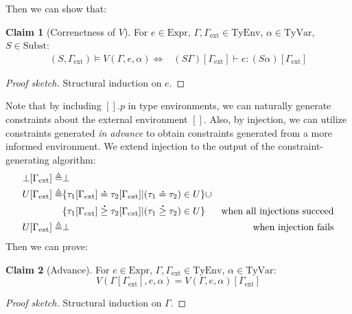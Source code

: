 \documentclass{article}
\theoremstyle{definition}
\newtheorem{clm}{Claim}[section]
\newcommand*{\A}[1]{\overset{\,_{\mbox{\Large .}}}{#1}}
\newcommand*{\Expr}{\text{Expr}}
\newcommand*{\TyEnv}{\text{TyEnv}}
\newcommand*{\TyVar}{\text{TyVar}}
\newcommand*{\Subst}{\text{Subst}}
\newcommand*{\external}{\Gamma_{\text{ext}}}
\begin{document}
Then we can show that:
\begin{clm}[Correnctness of $V$]
  For $e\in\Expr$, $\Gamma,\external\in\TyEnv$, $\alpha\in\TyVar$, $S\in\Subst$:
  \begin{align*}
    (S,\external)\vDash V(\Gamma,e,\alpha) \Leftrightarrow & (S\Gamma)[\external]\vdash e:(S\alpha)[\external]
  \end{align*}
\end{clm}
\begin{proof}[Proof sketch]
  Structural induction on $e$.
\end{proof}

Note that by including $[].p$ in type environments, we can naturally generate constraints about the external environment $[]$.
Also, by injection, we can utilize constraints generated \emph{in advance} to obtain constraints generated from a more informed environment.
We extend injection to the output of the constraint-generating algorithm:
\begin{align*}
  \bot[\external] \triangleq & \bot                                                                                                          \\
  U[\external]    \triangleq & \{\tau_1[\external]\A{=}\tau_2[\external]|(\tau_1\A{=}\tau_2)\in U\}\cup                                      \\
                             & \{\tau_1[\external]\A{\ge}\tau_2[\external]|(\tau_1\A{\ge}\tau_2)\in U\} & \text{when all injections succeed} \\
  U[\external]    \triangleq & \bot                                                                     & \text{when injection fails}
\end{align*}
Then we can prove:
\begin{clm}[Advance]
  For $e\in\Expr$, $\Gamma,\external\in\TyEnv$, $\alpha\in\TyVar$:
  \[V(\Gamma[\external],e,\alpha)=V(\Gamma,e,\alpha)[\external]\]
\end{clm}
\begin{proof}[Proof sketch]
  Structural induction on $\Gamma$.
\end{proof}
\end{document}
